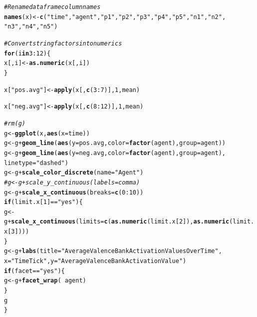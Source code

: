 \documentclass{article}\usepackage[]{graphicx}\usepackage[]{color}
\makeatletter
\newcommand{\hlnum}[1]{\textcolor[rgb]{0.686,0.059,0.569}{#1}}%
\newcommand{\hlstr}[1]{\textcolor[rgb]{0.192,0.494,0.8}{#1}}%
\newcommand{\hlcom}[1]{\textcolor[rgb]{0.678,0.584,0.686}{\textit{#1}}}%
\newcommand{\hlopt}[1]{\textcolor[rgb]{0,0,0}{#1}}%
\newcommand{\hlstd}[1]{\textcolor[rgb]{0.345,0.345,0.345}{#1}}%
\newcommand{\hlkwa}[1]{\textcolor[rgb]{0.161,0.373,0.58}{\textbf{#1}}}%
\newcommand{\hlkwb}[1]{\textcolor[rgb]{0.69,0.353,0.396}{#1}}%
\newcommand{\hlkwc}[1]{\textcolor[rgb]{0.333,0.667,0.333}{#1}}%
\newcommand{\hlkwd}[1]{\textcolor[rgb]{0.737,0.353,0.396}{\textbf{#1}}}%
\newenvironment{kframe}{%
 \def\at@end@of@kframe{}%
 \ifinner\ifhmode%
  \def\at@end@of@kframe{\end{minipage}}%
  \begin{minipage}{\columnwidth}%
 \fi\fi%
 \def\FrameCommand##1{\hskip\@totalleftmargin \hskip-\fboxsep
 \colorbox{shadecolor}{##1}\hskip-\fboxsep
     \hskip-\linewidth \hskip-\@totalleftmargin \hskip\columnwidth}%
 \MakeFramed {\advance\hsize-\width
   \@totalleftmargin\z@ \linewidth\hsize
   \@setminipage}}%
 {\par\unskip\endMakeFramed%
 \at@end@of@kframe}
\newenvironment{knitrout}{}{} %
\makeatother
\begin{document}
\begin{knitrout}
\begin{kframe}
\begin{alltt}
    \hlcom{# Rename dataframe column names}
    \hlkwd{names}\hlstd{(x)} \hlkwb{<-} \hlkwd{c}\hlstd{(}\hlstr{"time"}\hlstd{,} \hlstr{"agent"}\hlstd{,} \hlstr{"p1"}\hlstd{,} \hlstr{"p2"}\hlstd{,} \hlstr{"p3"}\hlstd{,} \hlstr{"p4"}\hlstd{,} \hlstr{"p5"}\hlstd{,} \hlstr{"n1"}\hlstd{,} \hlstr{"n2"}\hlstd{,}
        \hlstr{"n3"}\hlstd{,} \hlstr{"n4"}\hlstd{,} \hlstr{"n5"}\hlstd{)}

    \hlcom{# Convert string factors into numerics}
    \hlkwa{for} \hlstd{(i} \hlkwa{in} \hlnum{3}\hlopt{:}\hlnum{12}\hlstd{) \{}
        \hlstd{x[, i]} \hlkwb{<-} \hlkwd{as.numeric}\hlstd{(x[, i])}
    \hlstd{\}}

    \hlstd{x[}\hlstr{"pos.avg"}\hlstd{]} \hlkwb{<-} \hlkwd{apply}\hlstd{(x[,} \hlkwd{c}\hlstd{(}\hlnum{3}\hlopt{:}\hlnum{7}\hlstd{)],} \hlnum{1}\hlstd{, mean)}

    \hlstd{x[}\hlstr{"neg.avg"}\hlstd{]} \hlkwb{<-} \hlkwd{apply}\hlstd{(x[,} \hlkwd{c}\hlstd{(}\hlnum{8}\hlopt{:}\hlnum{12}\hlstd{)],} \hlnum{1}\hlstd{, mean)}

    \hlcom{# rm(g)}
    \hlstd{g} \hlkwb{<-} \hlkwd{ggplot}\hlstd{(x,} \hlkwd{aes}\hlstd{(}\hlkwc{x} \hlstd{= time))}
    \hlstd{g} \hlkwb{<-} \hlstd{g} \hlopt{+} \hlkwd{geom_line}\hlstd{(}\hlkwd{aes}\hlstd{(}\hlkwc{y} \hlstd{= pos.avg,} \hlkwc{color} \hlstd{=} \hlkwd{factor}\hlstd{(agent),} \hlkwc{group} \hlstd{= agent))}
    \hlstd{g} \hlkwb{<-} \hlstd{g} \hlopt{+} \hlkwd{geom_line}\hlstd{(}\hlkwd{aes}\hlstd{(}\hlkwc{y} \hlstd{= neg.avg,} \hlkwc{color} \hlstd{=} \hlkwd{factor}\hlstd{(agent),} \hlkwc{group} \hlstd{= agent),}
        \hlkwc{linetype} \hlstd{=} \hlstr{"dashed"}\hlstd{)}
    \hlstd{g} \hlkwb{<-} \hlstd{g} \hlopt{+} \hlkwd{scale_color_discrete}\hlstd{(}\hlkwc{name} \hlstd{=} \hlstr{"Agent"}\hlstd{)}
    \hlcom{# g <- g + scale_y_continuous(labels = comma)}
    \hlstd{g} \hlkwb{<-} \hlstd{g} \hlopt{+} \hlkwd{scale_x_continuous}\hlstd{(}\hlkwc{breaks} \hlstd{=} \hlkwd{c}\hlstd{(}\hlnum{0}\hlopt{:}\hlnum{10}\hlstd{))}
    \hlkwa{if} \hlstd{(limit.x[}\hlnum{1}\hlstd{]} \hlopt{==} \hlstr{"yes"}\hlstd{) \{}
        \hlstd{g} \hlkwb{<-} \hlstd{g} \hlopt{+} \hlkwd{scale_x_continuous}\hlstd{(}\hlkwc{limits} \hlstd{=} \hlkwd{c}\hlstd{(}\hlkwd{as.numeric}\hlstd{(limit.x[}\hlnum{2}\hlstd{]),} \hlkwd{as.numeric}\hlstd{(limit.x[}\hlnum{3}\hlstd{])))}
    \hlstd{\}}
    \hlstd{g} \hlkwb{<-} \hlstd{g} \hlopt{+} \hlkwd{labs}\hlstd{(}\hlkwc{title} \hlstd{=} \hlstr{"Average Valence Bank Activation Values Over Time"}\hlstd{,}
        \hlkwc{x} \hlstd{=} \hlstr{"Time Tick"}\hlstd{,} \hlkwc{y} \hlstd{=} \hlstr{"Average Valence Bank Activation Value"}\hlstd{)}
    \hlkwa{if} \hlstd{(facet} \hlopt{==} \hlstr{"yes"}\hlstd{) \{}
        \hlstd{g} \hlkwb{<-} \hlstd{g} \hlopt{+} \hlkwd{facet_wrap}\hlstd{(}\hlopt{~}\hlstd{agent)}
    \hlstd{\}}
    \hlstd{g}
\hlstd{\}}
\end{alltt}
\end{kframe}
\end{knitrout}
\end{document}
